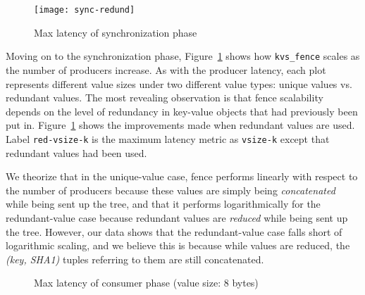 \begin{figure}
\centering
\texttt{[image: sync-redund]}
\caption{Max latency of synchronization phase}
\vspace{-.7cm}	
\label{fig:sync}
\end{figure}
 

Moving on to the synchronization phase, Figure~\ref{fig:sync} shows 
how {\tt kvs\_fence} scales as the number of producers increase. 
As with the producer latency,
each plot represents different value sizes under two different
value types: unique values vs. redundant values.
The most revealing observation is that
fence scalability depends on the level of
redundancy in key-value objects that had previously 
been put in. Figure~\ref{fig:sync} 
shows the improvements made when redundant values are used. 
Label {\tt red-vsize-k} is the maximum latency metric
as {\tt vsize-k} except that 
redundant values had been used.

We theorize that in the unique-value case, fence performs 
linearly with respect to the number of
producers because these values are simply being {\em concatenated} while
being sent up the tree, and that it performs logarithmically for the
redundant-value case
because redundant values are {\em reduced} while being sent 
up the tree. However, our data shows that the redundant-value case
falls short of logarithmic scaling, and we believe this is
because while values are reduced, the {\em (key, SHA1)} tuples
referring to them are still concatenated.

%
\begin{figure}[ht]
\centering
\begin{subfigure}[With single-directory layout]{
  \texttt{[image: consumer-1-dir]}
  \label{fig:cons:dir}
}%
\end{subfigure}
\begin{subfigure}[Improvements with multiple directories]{
  \texttt{[image: consumer-dist-dir]}
  \label{fig:cons:dirs}
}%
\end{subfigure}
\caption{Max latency of consumer phase (value size: 8 bytes)}
\vspace{-.3cm}
\label{fig:consumer}
\end{figure}

